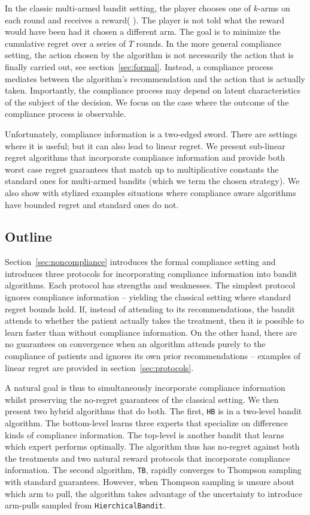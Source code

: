 In the classic multi-armed bandit setting, the player chooses one of $k$-arms on each round and receives a reward( \cite{auer:02b,auer:02}). The player is not told what the reward would have been had it chosen a different arm. The goal is to minimize the cumulative regret over a series of $T$ rounds. In the more general compliance setting, the action chosen by the algorithm is not necessarily the action that is finally carried out, see section~\ref{sec:formal}. Instead, a compliance process mediates between the algorithm's recommendation and the action that is actually taken. Importantly, the compliance process may depend on latent characteristics of the subject of the decision. We focus on the case where the outcome of the compliance process is observable.

Unfortunately, compliance information is a two-edged sword. There are settings where it is useful; but  it can also lead to linear regret. We present sub-linear regret algorithms that incorporate compliance information and provide both worst case regret guarantees that match up to multiplicative constants the standard ones for multi-armed bandits (which we term the chosen strategy). We also show with stylized examples situations where compliance aware algorithms have bounded regret and standard ones do not.


\subsection{Outline}
Section~\ref{sec:noncompliance} introduces the formal compliance setting and introduces three protocols for incorporating compliance information into bandit algorithms. Each protocol has strengths and weaknesses. The simplest protocol ignores compliance information -- yielding the classical setting where standard regret bounds hold. If, instead of attending to its recommendations, the bandit attends to whether the patient actually takes the treatment, then it is possible to learn faster than without compliance information. On the other hand, there are no guarantees on convergence when an algorithm attends purely to the compliance of patients and ignores its own prior recommendations -- examples of linear regret are provided in section~\ref{sec:protocols}. 

A natural goal is thus to simultaneously incorporate compliance information whilst preserving the no-regret guarantees of the classical setting. We then present two hybrid algorithms that do both. The first, \texttt{HB} is in a two-level bandit algorithm. The bottom-level learns three experts that specialize on difference kinds of compliance information. The top-level is another bandit that learns which expert performs optimally. The algorithm thus has no-regret against both the treatments and two natural reward protocols that incorporate compliance information. The second algorithm, \texttt{TB}, rapidly converges to Thompson sampling with standard guarantees. However, when Thompson sampling is unsure about which arm to pull, the algorithm takes advantage of the uncertainty to introduce arm-pulls sampled from \texttt{HierchicalBandit}.

